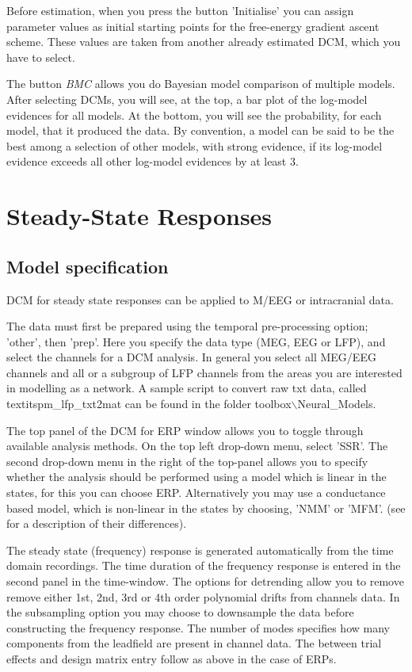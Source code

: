 Before estimation, when you press the button 'Initialise' you can
assign parameter values as initial starting points for the free-energy
gradient ascent scheme. These values are taken from another already
estimated DCM, which you have to select. 

The button \textit{BMC} allows you do Bayesian model comparison of
multiple models. After selecting DCMs, you will see, at the top, a
bar plot of the log-model evidences for all models. At the bottom, you
will see the probability, for each model, that it produced the
data. By convention, a model can be said to be the best among a
selection of other models, with strong evidence, if its log-model
evidence exceeds all other log-model evidences by at least 3. 

\section{Steady-State Responses}

\subsection{Model specification}
DCM for steady state responses can be applied to M/EEG or intracranial data. 

The data must first be prepared using the temporal pre-processing option; 'other', then 'prep'. Here you specify the data type (MEG, EEG or LFP), and select the channels for a DCM analysis. In general you select all MEG/EEG channels and all or a subgroup of LFP channels from the areas you are interested in modelling as a network. A sample script to convert raw txt data, called textit{spm\_lfp\_txt2mat} can be found in the folder toolbox$\backslash$Neural\_Models.

The top panel of the DCM for ERP window allows you to toggle through available analysis methods. On the top left drop-down menu, select 'SSR'. The second drop-down menu in the right of the top-panel allows you to specify whether the analysis should be performed using a model which is linear in the states, for this you can choose ERP. Alternatively you may use a conductance based model, which is non-linear in the states by choosing, 'NMM' or 'MFM'. (see \cite{andre_sigmoid} for a description of their differences).
 
The steady state (frequency) response is generated automatically from the time domain recordings. The time duration of the frequency response is entered in the second panel in the time-window.  The options for detrending allow you to remove remove either 1st, 2nd, 3rd or 4th order polynomial drifts from channels data. In the subsampling option you may choose to downsample the data before constructing the frequency response. The number of modes specifies how many components from the leadfield are present in channel data. The between trial effects and design matrix entry follow as above in the case of ERPs.

